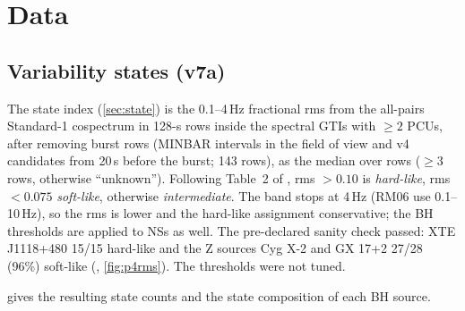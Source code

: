\section{Data}
\subsection{Variability states (v7a)}\label{sec:p4states}
The state index (\cref{sec:state}) is the 0.1--4\,Hz fractional rms from the all-pairs Standard-1 cospectrum in 128-s rows
inside the spectral GTIs with $\ge2$ PCUs, after removing burst rows (MINBAR intervals in the field of view and v4
candidates from 20\,s before the burst; 143 rows), as the median over rows ($\ge3$ rows, otherwise ``unknown''). Following
Table~2 of \citet{RemillardMcClintock2006}, rms $>0.10$ is \emph{hard-like}, rms $<0.075$ \emph{soft-like}, otherwise
\emph{intermediate}. The band stops at 4\,Hz (RM06 use 0.1--10\,Hz), so the rms is lower and the hard-like assignment
conservative; the BH thresholds are applied to NSs as well. The pre-declared sanity check passed: XTE J1118+480 15/15
hard-like and the Z sources Cyg X-2 and GX 17+2 27/28 (96\%) soft-like (,
\cref{fig:p4rms}). The thresholds were not tuned.

 gives the resulting state counts and the state composition of each BH source.

